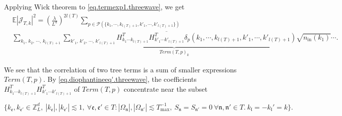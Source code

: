 Applying Wick theorem to \eqref{eq.termexp1.threewave}, we get
\begin{equation}\label{eq.termexp'.threewave}
\begin{split}
    &\mathbb{E}|\mathcal{J}_{T,k}|^2=\left(\frac{\lambda}{L^{d}}\right)^{2l(T)}
    \sum_{p\in \mathcal{P}(\{k_1,\cdots, k_{l(T)+1}, k'_1,\cdots, k'_{l(T)+1}\})}
    \\[0.5em]
    & \underbrace{\sum_{k_1,\, k_2,\, \cdots,\, k_{l(T)+1}}\sum_{k'_1,\, k'_2,\, \cdots,\, k'_{l(T)+1}} H^T_{k_1\cdots k_{l(T)+1}} \overline{H^{T}_{k'_1\cdots k'_{l(T)+1}}} \delta_{p}(k_1,\cdots, k_{l(T)+1}, k'_1,\cdots, k'_{l(T)+1})\sqrt{n_{\textrm{in}}(k_1)}\cdots}_{Term(T, p)_k}.
\end{split}
\end{equation}

We see that the correlation of two tree terms is a sum of smaller expressions $Term(T, p)$. By \eqref{eq.diophantineeq'.threewave}, the coefficients $H^T_{k_1\cdots k_{l(T)+1}} H^{T}_{k'_1\cdots k'_{l(T)+1}}$ of $Term(T, p)$ concentrate near the subset 

\begin{equation}\label{eq.diophantineequnpaired.threewave}
\{k_{\mathfrak{e}}, k_{\mathfrak{e}'}\in \mathbb{Z}^d_L,\ |k_{\mathfrak{e}}|, |k_{\mathfrak{e}'}|\lesssim 1,\ \forall \mathfrak{e},\mathfrak{e}'\in T:|\Omega_{\mathfrak{n}}|,|\Omega_{\mathfrak{n}'}|\lesssim T^{-1}_{\text{max}},\ S_{\mathfrak{n}}=S_{\mathfrak{n}'}=0\ \forall \mathfrak{n},\mathfrak{n}'\in T.\ k_{\mathfrak{l}}=-k_{\mathfrak{l}}'=k\}.
\end{equation}



